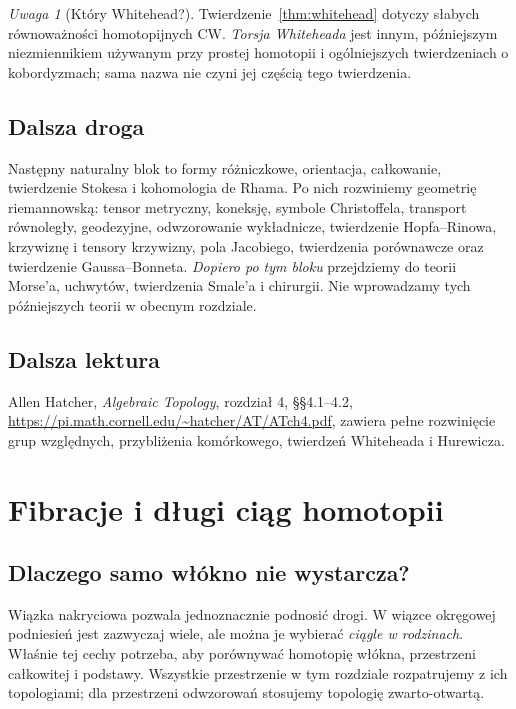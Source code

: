 \documentclass[11pt,a4paper,oneside]{report}
\theoremstyle{plain}
\theoremstyle{definition}
\theoremstyle{remark}
\newtheorem{uwaga}[twierdzenie]{Uwaga}
\begin{document}
\begin{uwaga}[Który Whitehead?]
Twierdzenie~\ref{thm:whitehead}
dotyczy słabych równoważności
homotopijnych CW.
\emph{Torsja Whiteheada}
jest innym, późniejszym
niezmiennikiem używanym
przy prostej homotopii
i ogólniejszych
twierdzeniach o
kobordyzmach; sama
nazwa nie czyni jej
częścią tego twierdzenia.
\end{uwaga}

\section*{Dalsza droga}
Następny naturalny blok to
formy różniczkowe,
orientacja, całkowanie,
twierdzenie Stokesa
i kohomologia de Rhama.
Po nich rozwiniemy
geometrię riemannowską:
tensor metryczny, koneksję,
symbole Christoffela,
transport równoległy,
geodezyjne, odwzorowanie
wykładnicze, twierdzenie
Hopfa--Rinowa, krzywiznę
i tensory krzywizny,
pola Jacobiego,
twierdzenia porównawcze
oraz twierdzenie
Gaussa--Bonneta.
\emph{Dopiero po tym bloku}
przejdziemy do teorii
Morse'a, uchwytów,
twierdzenia Smale'a
i chirurgii.
Nie wprowadzamy
tych późniejszych
teorii w obecnym rozdziale.

\section*{Dalsza lektura}
Allen Hatcher,
\emph{Algebraic Topology},
rozdział 4, §§4.1--4.2,
\url{https://pi.math.cornell.edu/~hatcher/AT/ATch4.pdf},
zawiera pełne rozwinięcie
grup względnych,
przybliżenia komórkowego,
twierdzeń Whiteheada
i Hurewicza.
\clearpage

\chapter{Fibracje i długi ciąg homotopii}
\label{ch:fibracje-v4}

\section{Dlaczego samo włókno nie wystarcza?}
Wiązka nakryciowa pozwala jednoznacznie podnosić drogi. W wiązce
okręgowej podniesień jest zazwyczaj wiele, ale można je wybierać
\emph{ciągle w rodzinach}. Właśnie tej cechy potrzeba, aby porównywać
homotopię włókna, przestrzeni całkowitej i podstawy. Wszystkie
przestrzenie w tym rozdziale rozpatrujemy z ich topologiami; dla
przestrzeni odwzorowań stosujemy topologię zwarto-otwartą.
\end{document}
